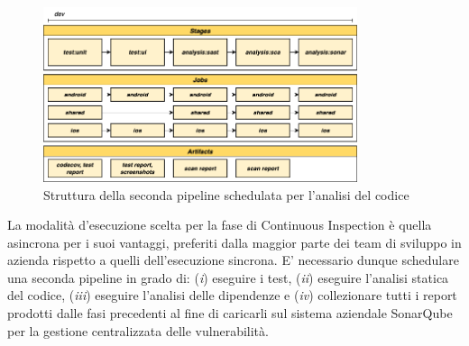 \begin{figure}[H]
    \centering
    \includegraphics[width=0.82\textwidth]{img/inspection-pipeline.png}
    \caption{Struttura della seconda pipeline schedulata per l'analisi del codice}
\end{figure}

La modalità d'esecuzione scelta per la fase di Continuous Inspection è quella asincrona per i suoi vantaggi, 
preferiti dalla maggior parte dei team di sviluppo in azienda rispetto a quelli dell'esecuzione sincrona.
E' necessario dunque schedulare una seconda pipeline in grado di: 
(\textit{i}) eseguire i test, 
(\textit{ii}) eseguire l'analisi statica del codice, 
(\textit{iii}) eseguire l'analisi delle dipendenze e (\textit{iv}) collezionare tutti i report prodotti dalle fasi precedenti al fine di caricarli sul sistema aziendale SonarQube per la gestione centralizzata delle vulnerabilità.